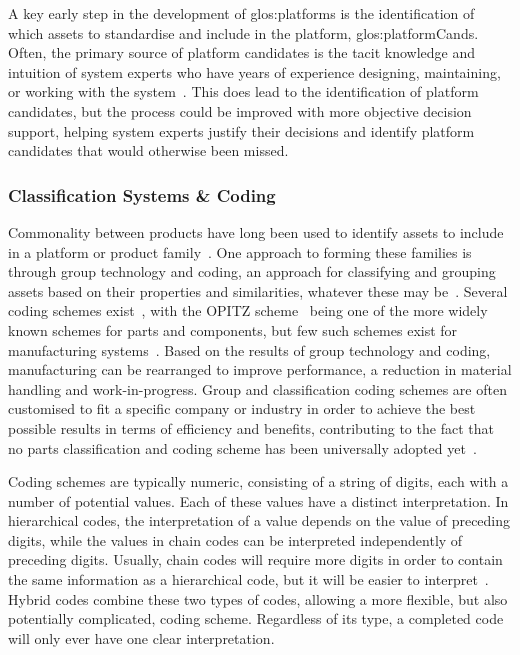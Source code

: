 A key early step in the development of \gls{glos:platform}s is the identification of which assets to standardise and include in the platform, \ie{} \gls{glos:platformCand}s.
Often, the primary source of platform candidates is the tacit knowledge and intuition of system experts who have years of experience designing, maintaining, or working with the system~\parencite{SorensenMCPC2017}.
This does lead to the identification of platform candidates, but the process could be improved with more objective decision support, helping system experts justify their decisions and identify platform candidates that would otherwise been missed.

\subsubsection*{Classification Systems \& Coding}
Commonality between products have long been used to identify assets to include in a platform or product family~\parencite{Thevenot2006,Fixson01062007,schuh2014}.
One approach to forming these families is through group technology and coding, an approach for classifying and grouping assets based on their properties and similarities, whatever these may be~\parencite{Shunk1985GT}.
Several coding schemes exist~\parencite{JUNG1991223}, with the OPITZ scheme~\parencite{doi:10.1080/00207547108929870} being one of the more widely known schemes for parts and components, but few such schemes exist for manufacturing systems~\parencite{ElMaraghy2006Complexity,elmaraghy2010classification,ELMARAGHY201451}.
Based on the results of group technology and coding, manufacturing can be rearranged to improve performance, \eg{} a reduction in material handling and work-in-progress.
Group and classification coding schemes are often customised to fit a specific company or industry in order to achieve the best possible results in terms of efficiency and benefits, contributing to the fact that no parts classification and coding scheme has been universally adopted yet~\parencite{GrooverFourthGlobal}.

Coding schemes are typically numeric, consisting of a string of digits, each with a number of potential values.
Each of these values have a distinct interpretation.
In hierarchical codes, the interpretation of a value depends on the value of preceding digits, while the values in chain codes can be interpreted independently of preceding digits.
Usually, chain codes will require more digits in order to contain the same information as a hierarchical code, but it will be easier to interpret~\parencite{GrooverFourthGlobal}.
Hybrid codes combine these two types of codes, allowing a more flexible, but also potentially complicated, coding scheme.
Regardless of its type, a completed code will only ever have one clear interpretation.

